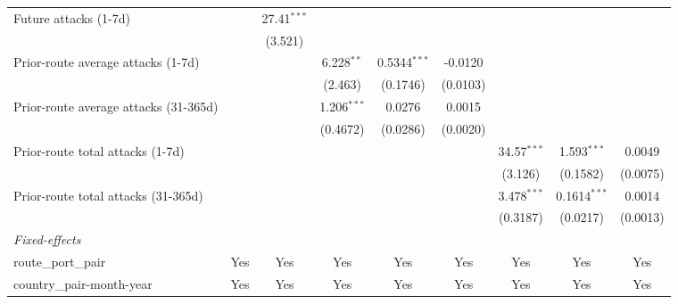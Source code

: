 \begin{tabular}{lcccccccc}
   Future attacks (1-7d)                 &                 & 27.41$^{***}$   &                 &                &                 &                 &                &   \\   
                                         &                 & (3.521)         &                 &                &                 &                 &                &   \\   
   Prior-route average attacks (1-7d)    &                 &                 & 6.228$^{**}$    & 0.5344$^{***}$ & -0.0120         &                 &                &   \\   
                                         &                 &                 & (2.463)         & (0.1746)       & (0.0103)        &                 &                &   \\   
   Prior-route average attacks (31-365d) &                 &                 & 1.206$^{***}$   & 0.0276         & 0.0015          &                 &                &   \\   
                                         &                 &                 & (0.4672)        & (0.0286)       & (0.0020)        &                 &                &   \\   
   Prior-route total attacks (1-7d)      &                 &                 &                 &                &                 & 34.57$^{***}$   & 1.593$^{***}$  & 0.0049\\   
                                         &                 &                 &                 &                &                 & (3.126)         & (0.1582)       & (0.0075)\\   
   Prior-route total attacks (31-365d)   &                 &                 &                 &                &                 & 3.478$^{***}$   & 0.1614$^{***}$ & 0.0014\\   
                                         &                 &                 &                 &                &                 & (0.3187)        & (0.0217)       & (0.0013)\\   
   \midrule
   \emph{Fixed-effects}\\
   route\_port\_pair                     & Yes             & Yes             & Yes             & Yes            & Yes             & Yes             & Yes            & Yes\\  
   country\_pair-month-year              & Yes             & Yes             & Yes             & Yes            & Yes             & Yes             & Yes            & Yes\\  

\end{tabular}
